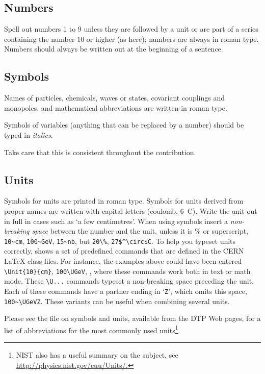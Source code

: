 \documentclass{cernrep}
\begin{document}
\subsection{Numbers}

Spell out numbers 1 to 9 unless they are followed by a unit or are
part of a series containing the number 10 or higher (as here); numbers
are always in roman type. Numbers should always be written out at the
beginning of a sentence.

\subsection{Symbols}

Names of particles, chemicals, waves or states, covariant couplings
and monopoles, and mathematical abbreviations are written in roman
type.

Symbols of variables (\ie anything that can be replaced by a number)
should be typed in \emph{italics}.

Take care that this is consistent throughout the contribution.

\subsection{Units}

Symbols for units are printed in roman type. Symbols for units derived
from proper names are written with capital letters (\eg coulomb, 6~C).
Write the unit out in full in cases such as `a few centimetres'.  When
using symbols insert a \emph{non-breaking space} between the number
and the unit, unless it is $\%$ or superscript, \eg \verb!10~cm!,
\verb!100~GeV!, \verb!15~nb!, but \verb!20\%!, \verb!27$^\circ$C!. To
help you typeset units correctly,  shows a set of
predefined commands that are defined in the CERN \LaTeX{} class files.
For instance, the examples above could have been entered
\verb!\Unit{10}{cm}!, \verb!100\UGeV!, \etc, where these commands work
both in text or math mode. These \verb!\U...! commands typeset a
non-breaking space preceding the unit.  Each of these commands have a
partner ending in `\texttt{Z}', which omits this space, \eg
\verb!100~\UGeVZ!. These variants can be useful when combining several
units.

Please see the file on symbols and units, available from the DTP Web
pages, for a list of abbreviations for the most commonly used
units\footnote{NIST also has a useful summary on the subject, see
\url{http://physics.nist.gov/cuu/Units/.}}.
\end{document}
